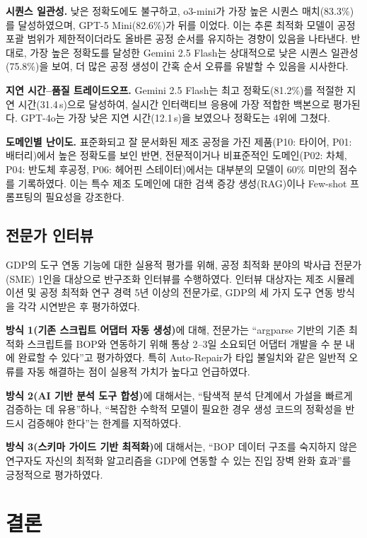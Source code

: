 \textbf{시퀀스 일관성.}
낮은 정확도에도 불구하고, o3-mini가 가장 높은 시퀀스 매치(83.3\%)를 달성하였으며, GPT-5 Mini(82.6\%)가 뒤를 이었다. 이는 추론 최적화 모델이 공정 포괄 범위가 제한적이더라도 올바른 공정 순서를 유지하는 경향이 있음을 나타낸다. 반대로, 가장 높은 정확도를 달성한 Gemini 2.5 Flash는 상대적으로 낮은 시퀀스 일관성(75.8\%)을 보여, 더 많은 공정 생성이 간혹 순서 오류를 유발할 수 있음을 시사한다.

\textbf{지연 시간--품질 트레이드오프.}
Gemini 2.5 Flash는 최고 정확도(81.2\%)를 적절한 지연 시간(31.4\,s)으로 달성하여, 실시간 인터랙티브 응용에 가장 적합한 백본으로 평가된다. GPT-4o는 가장 낮은 지연 시간(12.1\,s)을 보였으나 정확도는 4위에 그쳤다.

\textbf{도메인별 난이도.}
표준화되고 잘 문서화된 제조 공정을 가진 제품(P10: 타이어, P01: 배터리)에서 높은 정확도를 보인 반면, 전문적이거나 비표준적인 도메인(P02: 차체, P04: 반도체 후공정, P06: 헤어핀 스테이터)에서는 대부분의 모델이 60\% 미만의 점수를 기록하였다. 이는 특수 제조 도메인에 대한 검색 증강 생성(RAG)이나 Few-shot 프롬프팅의 필요성을 강조한다.

\subsection{전문가 인터뷰}

GDP의 도구 연동 기능에 대한 실용적 평가를 위해, 공정 최적화 분야의 박사급 전문가(SME) 1인을 대상으로 반구조화 인터뷰를 수행하였다. 인터뷰 대상자는 제조 시뮬레이션 및 공정 최적화 연구 경력 5년 이상의 전문가로, GDP의 세 가지 도구 연동 방식을 각각 시연받은 후 평가하였다.

\textbf{방식 1(기존 스크립트 어댑터 자동 생성)}에 대해, 전문가는 ``argparse 기반의 기존 최적화 스크립트를 BOP와 연동하기 위해 통상 2--3일 소요되던 어댑터 개발을 수 분 내에 완료할 수 있다''고 평가하였다. 특히 Auto-Repair가 타입 불일치와 같은 일반적 오류를 자동 해결하는 점이 실용적 가치가 높다고 언급하였다.

\textbf{방식 2(AI 기반 분석 도구 합성)}에 대해서는, ``탐색적 분석 단계에서 가설을 빠르게 검증하는 데 유용''하나, ``복잡한 수학적 모델이 필요한 경우 생성 코드의 정확성을 반드시 검증해야 한다''는 한계를 지적하였다.

\textbf{방식 3(스키마 가이드 기반 최적화)}에 대해서는, ``BOP 데이터 구조를 숙지하지 않은 연구자도 자신의 최적화 알고리즘을 GDP에 연동할 수 있는 진입 장벽 완화 효과''를 긍정적으로 평가하였다.

\section{결론}
\label{sec:conclusion}

